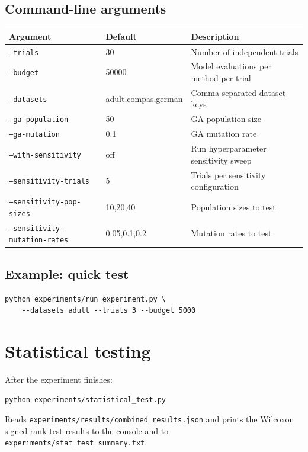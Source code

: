 \documentclass[10pt]{article}
\begin{document}
\subsection{Command-line arguments}

\begin{table}[h]
\centering
\small
\begin{tabular}{lll}
\toprule
Argument & Default & Description \\
\midrule
\texttt{--trials}     & 30    & Number of independent trials \\
\texttt{--budget}     & 50000 & Model evaluations per method per trial \\
\texttt{--datasets}   & adult,compas,german & Comma-separated dataset keys \\
\texttt{--ga-population} & 50 & GA population size \\
\texttt{--ga-mutation}   & 0.1 & GA mutation rate \\
\texttt{--with-sensitivity} & off & Run hyperparameter sensitivity sweep \\
\texttt{--sensitivity-trials} & 5 & Trials per sensitivity configuration \\
\texttt{--sensitivity-pop-sizes} & 10,20,40 & Population sizes to test \\
\texttt{--sensitivity-mutation-rates} & 0.05,0.1,0.2 & Mutation rates to test \\
\bottomrule
\end{tabular}
\end{table}

\subsection{Example: quick test}

\begin{verbatim}
python experiments/run_experiment.py \
    --datasets adult --trials 3 --budget 5000
\end{verbatim}

\section{Statistical testing}

After the experiment finishes:

\begin{verbatim}
python experiments/statistical_test.py
\end{verbatim}

Reads \texttt{experiments/results/combined\_results.json} and prints the Wilcoxon
signed-rank test results to the console and to
\texttt{experiments/stat\_test\_summary.txt}.
\end{document}
